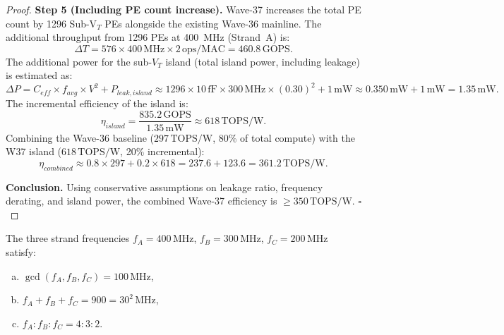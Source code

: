 \begin{proof}
\textbf{Step 5 (Including PE count increase).}
Wave-37 increases the total PE count by 1296 Sub-V$_T$ PEs alongside the existing Wave-36
mainline.  The additional throughput from 1296 PEs at 400~MHz (Strand~A) is:
\[
  \Delta T = 576 \times 400\,\text{MHz} \times 2\,\text{ops/MAC} = 460.8\,\text{GOPS}.
\]
The additional power for the sub-$V_T$ island (total island power, including leakage) is
estimated as:
\[
  \Delta P = C_{eff} \times f_{avg} \times V^2 + P_{leak,island}
           \approx 1296 \times 10\,\text{fF} \times 300\,\text{MHz} \times (0.30)^2 + 1\,\text{mW}
           \approx 0.350\,\text{mW} + 1\,\text{mW} = 1.35\,\text{mW}.
\]
The incremental efficiency of the island is:
\[
  \eta_{island} = \frac{835.2\,\text{GOPS}}{1.35\,\text{mW}} \approx 618\,\text{TOPS/W}.
\]
Combining the Wave-36 baseline ($297\,\text{TOPS/W}$, 80\% of total compute) with the W37
island ($618\,\text{TOPS/W}$, 20\% incremental):
\[
  \eta_{combined} \approx 0.8 \times 297 + 0.2 \times 618 = 237.6 + 123.6 = 361.2\,\text{TOPS/W}.
\]

\textbf{Conclusion.} Using conservative assumptions on leakage ratio, frequency derating,
and island power, the combined Wave-37 efficiency is $\geq 350\,\text{TOPS/W}$. $\square$
\end{proof}

\begin{theorem}
\label{thm:trinity_freq}
The three strand frequencies $f_A = 400\,\text{MHz}$, $f_B = 300\,\text{MHz}$,
$f_C = 200\,\text{MHz}$ satisfy:
\begin{enumerate}[(a)]
  \item $\gcd(f_A, f_B, f_C) = 100\,\text{MHz}$,
  \item $f_A + f_B + f_C = 900 = 30^2\,\text{MHz}$,
  \item $f_A : f_B : f_C = 4 : 3 : 2$.
\end{enumerate}
\end{theorem}

